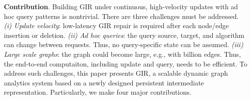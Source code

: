 
\textbf{Contribution}.
Building GIR under continuous, high-velocity updates with ad hoc query patterns is nontrivial.
There are three challenges must be addressed.
\emph{(i) Update velocity}: low-latency GIR repair is required after each node/edge insertion or deletion.
\emph{(ii) Ad hoc queries}: the query source, target, and algorithm can change between requests. Thus, no query-specific state can be assumed.
\emph{(iii) Large scale graphs}: the graph could become large, e.g., with billion edges. Thus, the end-to-end computaiton, including update and query, needs to be efficient.
To address such challenges, this paper presents GIR, a scalable dynamic graph analytics system based on a newly designed persistent intermediate representation. Particularly, we make four major contributions.


